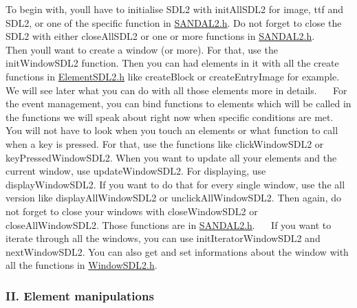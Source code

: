 To begin with, you\textquotesingle{}ll have to initialise S\+D\+L2 with init\+All\+S\+D\+L2 for image, ttf and S\+D\+L2, or one of the specific function in \hyperlink{SANDAL2_8h}{S\+A\+N\+D\+A\+L2.\+h}. Do not forget to close the S\+D\+L2 with either close\+All\+S\+D\+L2 or one or more functions in \hyperlink{SANDAL2_8h}{S\+A\+N\+D\+A\+L2.\+h}.~\newline
~\newline
 Then you\textquotesingle{}ll want to create a window (or more). For that, use the init\+Window\+S\+D\+L2 function. Then you can had elements in it with all the create functions in \hyperlink{ElementSDL2_8h}{Element\+S\+D\+L2.\+h} like create\+Block or create\+Entry\+Image for example. We will see later what you can do with all those elements more in details.~\newline
~\newline
 For the event management, you can bind functions to elements which will be called in the functions we will speak about right now when specific conditions are met. You will not have to look when you touch an elements or what function to call when a key is pressed. For that, use the functions like click\+Window\+S\+D\+L2 or key\+Pressed\+Window\+S\+D\+L2. When you want to update all your elements and the current window, use update\+Window\+S\+D\+L2. For displaying, use display\+Window\+S\+D\+L2. If you want to do that for every single window, use the \textquotesingle{}all\textquotesingle{} version like display\+All\+Window\+S\+D\+L2 or unclick\+All\+Window\+S\+D\+L2. Then again, do not forget to close your windows with close\+Window\+S\+D\+L2 or close\+All\+Window\+S\+D\+L2. Those functions are in \hyperlink{SANDAL2_8h}{S\+A\+N\+D\+A\+L2.\+h}.~\newline
~\newline
 If you want to iterate through all the windows, you can use init\+Iterator\+Window\+S\+D\+L2 and next\+Window\+S\+D\+L2. You can also get and set informations about the window with all the functions in \hyperlink{WindowSDL2_8h}{Window\+S\+D\+L2.\+h}.~\newline


\subsubsection*{II. Element manipulations}

